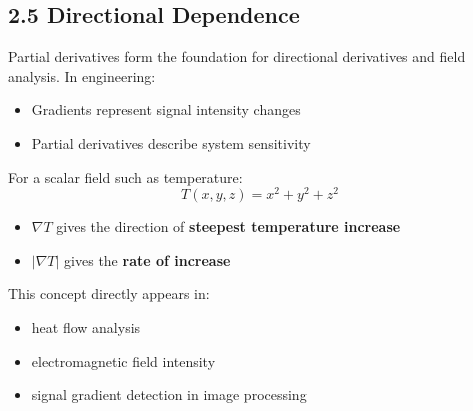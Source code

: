 \subsection*{2.5 Directional Dependence}

\begin{conceptbox}
    Partial derivatives form the foundation for directional derivatives and field analysis.
    In engineering:
    \begin{itemize}
        \item Gradients represent signal intensity changes
        \item Partial derivatives describe system sensitivity
    \end{itemize}
\end{conceptbox}



\begin{examplebox}
    For a scalar field such as temperature:
    \begin{equation*}
        T(x,y,z) = x^2 + y^2 + z^2
    \end{equation*}

    \begin{itemize}
        \item $\nabla T$ gives the direction of \textbf{steepest temperature increase}
        \item $|\nabla T|$ gives the \textbf{rate of increase}
    \end{itemize}

    This concept directly appears in:

    \begin{itemize}
        \item heat flow analysis
        \item electromagnetic field intensity
        \item signal gradient detection in image processing
    \end{itemize}
\end{examplebox}